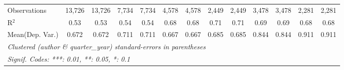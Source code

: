 \begin{tabular}{lcccccccccccc}
   Observations                             & 13,726        & 13,726   & 7,734         & 7,734    & 4,578         & 4,578          & 2,449         & 2,449         & 3,478   & 3,478   & 2,281   & 2,281\\  
   R$^2$                                    & 0.53          & 0.53     & 0.54          & 0.54     & 0.68          & 0.68           & 0.71          & 0.71          & 0.69    & 0.69    & 0.68    & 0.68\\  
Mean(Dep. Var.) & 0.672 & 0.672 & 0.711 & 0.711 & 0.667 & 0.667 & 0.685 & 0.685 & 0.844 & 0.844 & 0.911 & 0.911 \\
   \midrule \midrule
   \multicolumn{13}{l}{\emph{Clustered (author \& quarter\_year) standard-errors in parentheses}}\\
   \multicolumn{13}{l}{\emph{Signif. Codes: ***: 0.01, **: 0.05, *: 0.1}}\\
\end{tabular}
\par\endgroup
